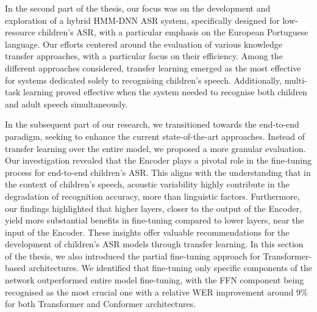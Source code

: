 In the second part of the thesis, our focus was on the development and exploration of a hybrid \ac{HMM-DNN} \ac{ASR} system, specifically designed for low-resource children's \ac{ASR}, with a particular emphasis on the European Portuguese language. Our efforts centered around the evaluation of various knowledge transfer approaches, with a particular focus on their efficiency. Among the different approaches considered, transfer learning emerged as the most effective for systems dedicated solely to recognising children's speech. Additionally, multi-task learning proved effective when the system needed to recognise both children and adult speech simultaneously.

In the subsequent part of our research, we transitioned towards the end-to-end paradigm, seeking to enhance the current state-of-the-art approaches. Instead of transfer learning over the entire model, we proposed a more granular evaluation. Our investigation revealed that the Encoder plays a pivotal role in the fine-tuning process for end-to-end children's \ac{ASR}. This aligns with the understanding that in the context of children's speech, acoustic variability highly contribute in the degradation of recognition accuracy, more than linguistic factors. Furthermore, our findings highlighted that higher layers, closer to the output of the Encoder, yield more substantial benefits in fine-tuning compared to lower layers, near the input of the Encoder. These insights offer valuable recommendations for the development of children's \ac{ASR} models through transfer learning. In this section of the thesis, we also introduced the partial fine-tuning approach for Transformer-based architectures. We identified that fine-tuning only specific components of the network outperformed entire model fine-tuning, with the \ac{FFN} component being recognised as the most crucial one with a relative \ac{WER} improvement around 9\% for both Transformer and Conformer architectures.

